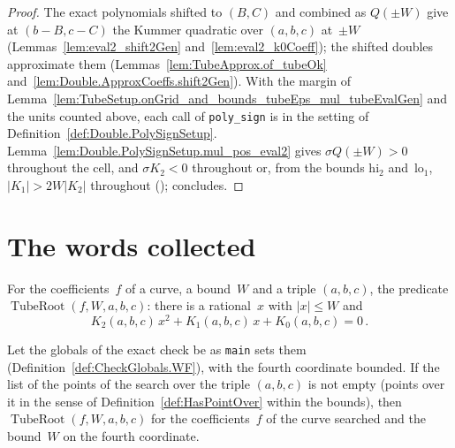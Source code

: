 \begin{proof}
  \leanok
  The exact polynomials shifted to $(B, C)$ and combined as $Q(\pm W)$ give at $(b - B, c - C)$ the
  Kummer quadratic over $(a, b, c)$ at~$\pm W$ (Lemmas~\ref{lem:eval2_shift2Gen}
  and~\ref{lem:eval2_k0Coeff}); the shifted doubles approximate them
  (Lemmas~\ref{lem:TubeApprox.of_tubeOk} and~\ref{lem:Double.ApproxCoeffs.shift2Gen}). With the
  margin of Lemma~\ref{lem:TubeSetup.onGrid_and_bounds_tubeEps_mul_tubeEvalGen} and the units
  counted above, each call of \texttt{poly\_sign} is in the setting of
  Definition~\ref{def:Double.PolySignSetup}. Lemma~\ref{lem:Double.PolySignSetup.mul_pos_eval2}
  gives $\sigma Q(\pm W) > 0$ throughout the cell, and $\sigma K_2 < 0$ throughout or, from the
  bounds $\mathrm{hi}_2$ and~$\mathrm{lo}_1$, $|K_1| > 2W|K_2|$ throughout
  (); 
  concludes.
\end{proof}

\section{The words collected}\label{sec:tubeCover}

\begin{definition}\label{def:TubeRoot}
  \leanok
  For the coefficients~$f$ of a curve, a bound~$W$ and a triple $(a, b, c)$, the predicate
  $\operatorname{TubeRoot}(f, W, a, b, c)$: there is a rational~$x$ with $|x| \le W$ and
  \[
    K_2(a, b, c)\, x^2 + K_1(a, b, c)\, x + K_0(a, b, c) = 0\,.
  \]
\end{definition}

\begin{lemma}\label{lem:CheckGlobals.WF.tubeRoot_of_points_ne_nil}
  \leanok
  Let the globals of the exact check be as \texttt{main} sets them
  (Definition~\ref{def:CheckGlobals.WF}), with the fourth coordinate bounded. If the list
   of the points of the search over the triple $(a, b, c)$ is not
  empty (points over it in the sense of Definition~\ref{def:HasPointOver} within the bounds), then $\operatorname{TubeRoot}(f, W, a, b, c)$ for the
  coefficients~$f$ of the curve searched and the bound~$W$ on the fourth coordinate.
\end{lemma}

